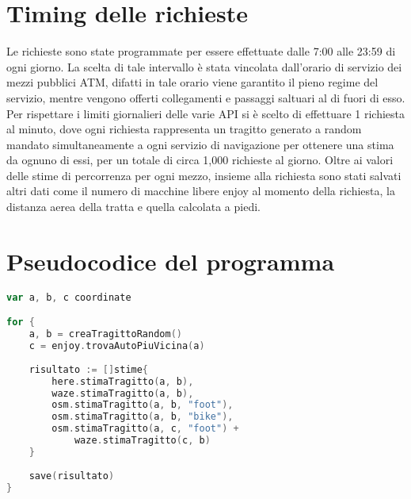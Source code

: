 \section{Timing delle richieste}

Le richieste sono state programmate per essere effettuate dalle 7:00 alle 23:59 di ogni giorno. La scelta di tale intervallo è stata vincolata dall'orario di servizio dei mezzi pubblici ATM, difatti in tale orario viene garantito il pieno regime del servizio, mentre vengono offerti collegamenti e passaggi saltuari al di fuori di esso.
Per rispettare i limiti giornalieri delle varie API si è scelto di effettuare 1 richiesta al minuto, dove ogni richiesta rappresenta un tragitto generato a random mandato simultaneamente a ogni servizio di navigazione per ottenere una stima da ognuno di essi, per un totale di circa 1,000 richieste al giorno. Oltre ai valori delle stime di percorrenza per ogni mezzo, insieme alla richiesta sono stati salvati altri dati come il numero di macchine libere enjoy al momento della richiesta, la distanza aerea della tratta e quella calcolata a piedi. 

\section{Pseudocodice del programma}

\begin{lstlisting}[language=Go]
var a, b, c coordinate

for {
	a, b = creaTragittoRandom()
	c = enjoy.trovaAutoPiuVicina(a)
	
	risultato := []stime{
		here.stimaTragitto(a, b),
		waze.stimaTragitto(a, b),
		osm.stimaTragitto(a, b, "foot"),
		osm.stimaTragitto(a, b, "bike"),
		osm.stimaTragitto(a, c, "foot") +
			waze.stimaTragitto(c, b)
	}
	
	save(risultato)
}
\end{lstlisting}